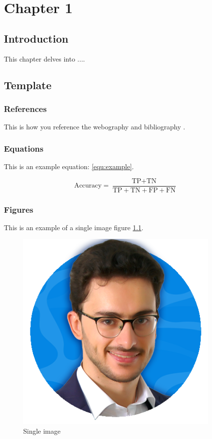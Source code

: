 \chapter{Chapter 1}
\minitoc
\label{chap:1st}
\section*{Introduction}
    This chapter delves into ....

\section{Template}
    \subsection{References}
        This is how you reference the webography \cite{web:melek} and bibliography \cite{ref:example}.
        
    \subsection{Equations}
        This is an example equation: \ref{equ:example}.

       \begin{equation}
            \text{Accuracy} = \frac{\text{TP} + \text{TN}}{\text{TP} + \text{TN} + \text{FP} + \text{FN}}
            \label{equ:example}
        \end{equation}


        

        
    \subsection{Figures}
        This is an example of a single image figure \ref{img:single}.

        \begin{figure}[htbp]
        \centerline{\includegraphics[width=0.9\textwidth]{images/example.png}}
        \caption{Single image}
        \label{img:single}   
        \end{figure}

